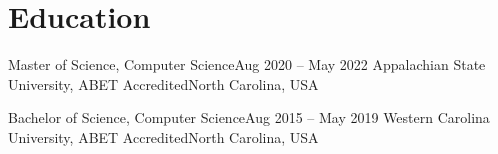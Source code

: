 \section{Education}
\resumeSubHeadingListStart

  \resumeSubHeading
    {Master of Science, Computer Science}{Aug 2020 -- May 2022}
    {Appalachian State University, ABET Accredited}{North Carolina, USA}
    \resumeItemListStart
    \resumeItemListEnd

  \resumeSubHeading
    {Bachelor of Science, Computer Science}{Aug 2015 -- May 2019}
    {Western Carolina University, ABET Accredited}{North Carolina, USA}
    \resumeItemListStart
    \resumeItemListEnd

\resumeSubHeadingListEnd
